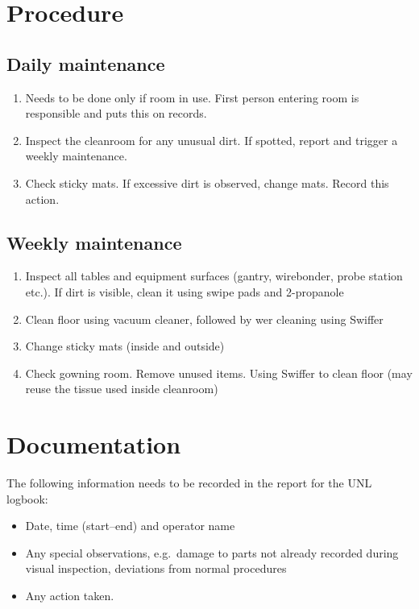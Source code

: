 \documentclass[12pt]{unlsilabsop}
\begin{document}

\section{Procedure}

\subsection{Daily maintenance}
\begin{enumerate}
    \item Needs to be done only if room in use. First person entering room is responsible and puts this on records.
    \item Inspect the cleanroom for any unusual dirt. If spotted, report and trigger a weekly maintenance.
    \item Check sticky mats. If excessive dirt is observed, change mats. Record this action.
\end{enumerate}

\subsection{Weekly maintenance}
\begin{enumerate}
    \item Inspect all tables and equipment surfaces (gantry, wirebonder, probe station etc.). If dirt is visible, clean it using swipe pads and 2-propanole
    \item Clean floor using vacuum cleaner, followed by wer cleaning using Swiffer
    \item Change sticky mats (inside and outside)
    \item Check gowning room. Remove unused items. Using Swiffer to clean floor (may reuse the tissue used inside cleanroom)
\end{enumerate}

\section{Documentation}
The following information needs to be recorded in the report for the UNL logbook:
\begin{itemize}
    \item Date, time (start--end) and operator name
    \item Any special observations, e.g.~damage to parts not already recorded during visual inspection, deviations from normal procedures
    \item Any action taken.
\end{itemize}
\end{document}
